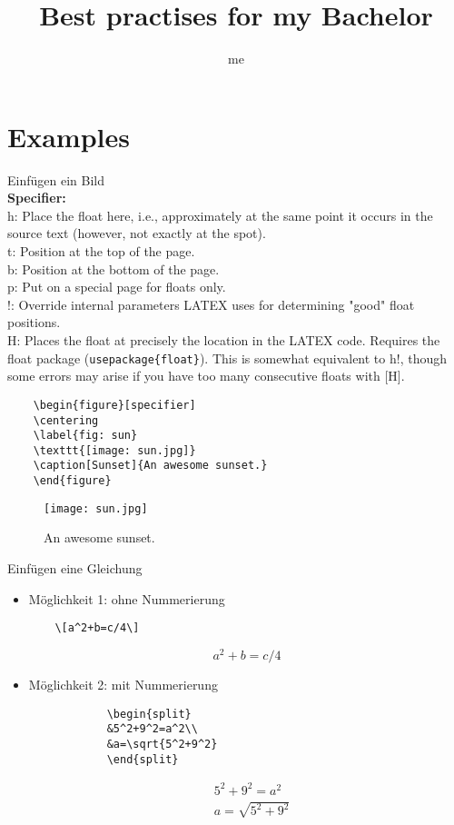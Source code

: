 \documentclass[a4paper, 12pt]{article}
\title{Best practises for my Bachelor}
\author{me \faMoonO}
\begin{document}
\maketitle
\setlength{\parindent}{0em}
\setlength{\parskip}{0.5em}
\renewcommand{\baselinestretch}{1}

\section{Examples}

\faChevronCircleRight\hspace{0.5cm} Einfügen ein Bild\\
\textbf{Specifier:}\\ h: Place the float here, i.e., approximately at the same 
point it occurs in the source text (however, not exactly at the spot).\\ t: 
Position at the top of the page.\\ b: Position at the bottom of the page.\\ 
p: Put on a special page for floats only.\\ !: 	Override internal parameters 
LATEX uses for determining "good" float positions.\\ H: Places the float at 
precisely the location in the LATEX code. Requires the float package 
(\verb|usepackage{float}|). This is somewhat equivalent to h!, though some 
errors may arise if you have too many consecutive floats with [H].
\begin{verbatim}
	\begin{figure}[specifier]
	\centering
	\label{fig: sun}
	\texttt{[image: sun.jpg]}
	\caption[Sunset]{An awesome sunset.}
	\end{figure}
\end{verbatim}
\begin{figure}[ht]
	\centering
	\label{fig: sun}
	\texttt{[image: sun.jpg]}
	\caption[Sunset]{An awesome sunset.}
\end{figure}
\pagebreak
\faChevronCircleRight\hspace{0.5cm} Einfügen eine Gleichung
\begin{itemize}
	\item Möglichkeit 1: ohne Nummerierung
	\begin{verbatim}
	\[a^2+b=c/4\]
	\end{verbatim}
	\[a^2+b=c/4\]
	\item Möglichkeit 2: mit Nummerierung
	\begin{verbatim}
			\begin{split}
			&5^2+9^2=a^2\\
			&a=\sqrt{5^2+9^2}
			\end{split}
	\end{verbatim}
\begin{equation}
	\begin{split}
	&5^2+9^2=a^2\\
	&a=\sqrt{5^2+9^2}
	\end{split}
\end{equation}
\end{itemize}
\end{document}
